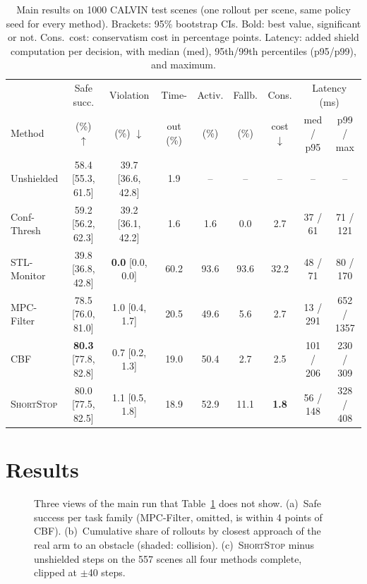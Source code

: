 \documentclass[runningheads]{llncs}
\newcommand{\sys}{\textsc{ShortStop}}
\begin{document}
\begin{table}[ht]
\caption{Main results on 1000 CALVIN test scenes (one rollout per scene,
same policy seed for every method). Brackets: 95\% bootstrap CIs. Bold: best value, significant or not. Cons.\ cost:
conservatism cost in percentage points. Latency: added shield computation
per decision, with median (med), 95th/99th percentiles (p95/p99), and maximum.}\label{tab:main}
\centering\scriptsize\setlength{\tabcolsep}{1.6pt}
\begin{tabular}{@{}lcccccccc@{}}
\toprule
 & Safe succ. & Violation & Time- & Activ. & Fallb. & Cons. & \multicolumn{2}{c}{Latency (ms)} \\
\cmidrule(l){8-9}
Method & (\%) $\uparrow$ & (\%) $\downarrow$ & out (\%) & (\%) & (\%) & cost $\downarrow$ & med / p95 & p99 / max \\
\midrule
Unshielded & 58.4 [55.3, 61.5] & 39.7 [36.6, 42.8] & 1.9 & -- & -- & -- & -- & -- \\
Conf-Thresh & 59.2 [56.2, 62.3] & 39.2 [36.1, 42.2] & 1.6 & 1.6 & 0.0 & 2.7 & 37 / 61 & 71 / 121 \\
STL-Monitor & 39.8 [36.8, 42.8] & \textbf{0.0} [0.0, 0.0] & 60.2 & 93.6 & 93.6 & 32.2 & 48 / 71 & 80 / 170 \\
MPC-Filter & 78.5 [76.0, 81.0] & 1.0 [0.4, 1.7] & 20.5 & 49.6 & 5.6 & 2.7 & 13 / 291 & 652 / 1357 \\
CBF & \textbf{80.3} [77.8, 82.8] & 0.7 [0.2, 1.3] & 19.0 & 50.4 & 2.7 & 2.5 & 101 / 206 & 230 / 309 \\
\sys{} & 80.0 [77.5, 82.5] & 1.1 [0.5, 1.8] & 18.9 & 52.9 & 11.1 & \textbf{1.8} & 56 / 148 & 328 / 408 \\
\bottomrule
\end{tabular}
\end{table}

\section{Results}\label{sec:results}

\begin{figure}[t]
\centering

\caption{Three views of the main run that Table~\ref{tab:main} does not show.
(a)~Safe success per task family (MPC-Filter, omitted, is within 4 points of
CBF). (b)~Cumulative share of rollouts by closest approach of the real arm
to an obstacle (shaded: collision). (c)~\sys{} minus unshielded steps on the
557 scenes all four methods complete, clipped at $\pm$40 steps.}
\label{fig:views}
\end{figure}
\end{document}
